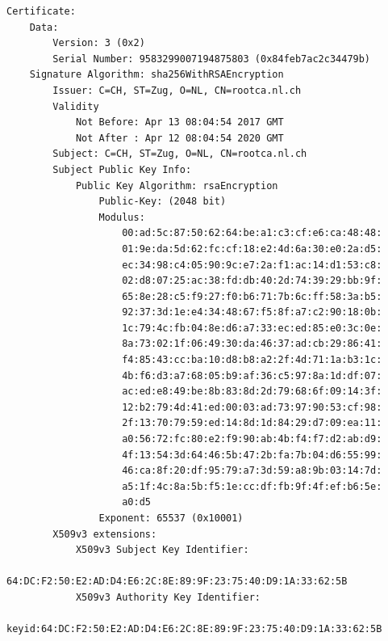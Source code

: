 \documentclass[a4paper]{report}
\begin{document}
\begin{lstlisting}[language={}, basicstyle=\ttfamily\scriptsize, numberstyle=\ttfamily\scriptsize, stepnumber=5, firstnumber=1, numberfirstline=false]
Certificate:
    Data:
        Version: 3 (0x2)
        Serial Number: 9583299007194875803 (0x84feb7ac2c34479b)
    Signature Algorithm: sha256WithRSAEncryption
        Issuer: C=CH, ST=Zug, O=NL, CN=rootca.nl.ch
        Validity
            Not Before: Apr 13 08:04:54 2017 GMT
            Not After : Apr 12 08:04:54 2020 GMT
        Subject: C=CH, ST=Zug, O=NL, CN=rootca.nl.ch
        Subject Public Key Info:
            Public Key Algorithm: rsaEncryption
                Public-Key: (2048 bit)
                Modulus:
                    00:ad:5c:87:50:62:64:be:a1:c3:cf:e6:ca:48:48:
                    01:9e:da:5d:62:fc:cf:18:e2:4d:6a:30:e0:2a:d5:
                    ec:34:98:c4:05:90:9c:e7:2a:f1:ac:14:d1:53:c8:
                    02:d8:07:25:ac:38:fd:db:40:2d:74:39:29:bb:9f:
                    65:8e:28:c5:f9:27:f0:b6:71:7b:6c:ff:58:3a:b5:
                    92:37:3d:1e:e4:34:48:67:f5:8f:a7:c2:90:18:0b:
                    1c:79:4c:fb:04:8e:d6:a7:33:ec:ed:85:e0:3c:0e:
                    8a:73:02:1f:06:49:30:da:46:37:ad:cb:29:86:41:
                    f4:85:43:cc:ba:10:d8:b8:a2:2f:4d:71:1a:b3:1c:
                    4b:f6:d3:a7:68:05:b9:af:36:c5:97:8a:1d:df:07:
                    ac:ed:e8:49:be:8b:83:8d:2d:79:68:6f:09:14:3f:
                    12:b2:79:4d:41:ed:00:03:ad:73:97:90:53:cf:98:
                    2f:13:70:79:59:ed:14:8d:1d:84:29:d7:09:ea:11:
                    a0:56:72:fc:80:e2:f9:90:ab:4b:f4:f7:d2:ab:d9:
                    4f:13:54:3d:64:46:5b:47:2b:fa:7b:04:d6:55:99:
                    46:ca:8f:20:df:95:79:a7:3d:59:a8:9b:03:14:7d:
                    a5:1f:4c:8a:5b:f5:1e:cc:df:fb:9f:4f:ef:b6:5e:
                    a0:d5
                Exponent: 65537 (0x10001)
        X509v3 extensions:
            X509v3 Subject Key Identifier: 
                64:DC:F2:50:E2:AD:D4:E6:2C:8E:89:9F:23:75:40:D9:1A:33:62:5B
            X509v3 Authority Key Identifier: 
                keyid:64:DC:F2:50:E2:AD:D4:E6:2C:8E:89:9F:23:75:40:D9:1A:33:62:5B


\end{lstlisting}
\end{document}
